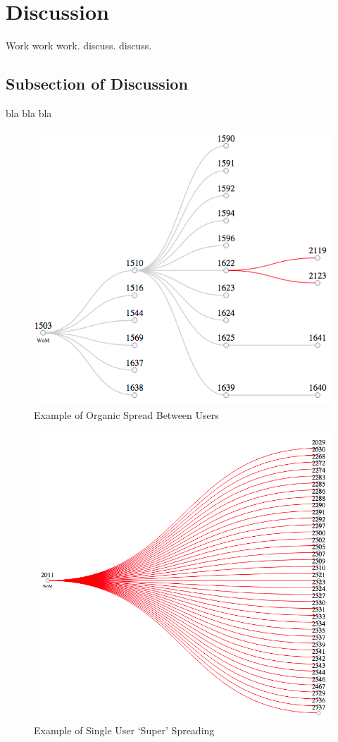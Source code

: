\section{Discussion} 
Work work work. discuss. discuss. 

\subsection{Subsection of Discussion}
bla bla bla

\begin{figure}[t!]
	\hspace*{-2mm}
		\includegraphics[width=\linewidth]{img/deep-tree.png}
	\caption{Example of Organic Spread Between Users}
	\label{fig:sustained}
\end{figure} 

\begin{figure}[t!]
	\hspace*{-2mm}
		\includegraphics[width=\linewidth]{img/super-spreader.png}
	\caption{Example of Single User `Super' Spreading}
	\label{fig:super}
\end{figure}
